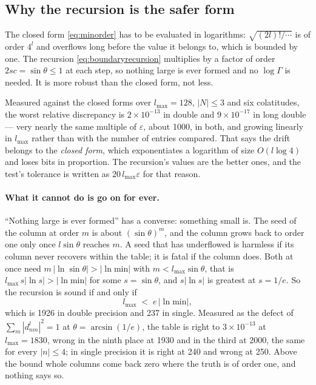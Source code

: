 \documentclass[11pt,a4paper]{article}
\begin{document}
\subsection{Why the recursion is the safer form}

The closed form \eqref{eq:minorder} has to be evaluated in logarithms:
$\sqrt{(2l)!/\cdots}$ is of order $4^l$ and overflows long before the value
it belongs to, which is bounded by one.  The recursion
\eqref{eq:boundaryrecursion} multiplies by a factor of order $2sc =
\sin\theta \leq 1$ at each step, so nothing large is ever formed and no
$\log\Gamma$ is needed.  It is more robust than the closed form, not less.

Measured against the closed forms over $l_{\max}=128$, $|N|\leq 3$ and six
colatitudes, the worst relative discrepancy is $2\times10^{-13}$ in double
and $9\times10^{-17}$ in long double --- very nearly the same multiple of
$\varepsilon$, about 1000, in both, and growing linearly in $l_{\max}$
rather than with the number of entries compared.  That says the drift
belongs to the \emph{closed form}, which exponentiates a logarithm of size
$O(l\log 4)$ and loses bits in proportion.  The recursion's values are the
better ones, and the test's tolerance is written as $20\,l_{\max}
\varepsilon$ for that reason.

\paragraph{What it cannot do is go on for ever.}  ``Nothing large is ever
formed'' has a converse: something small is.  The seed of the column at
order $m$ is about $(\sin\theta)^m$, and the column grows back to order one
only once $l\sin\theta$ reaches $m$.  A seed that has underflowed is
harmless if its column never recovers within the table; it is fatal if the
column does.  Both at once need $m\,|\ln\sin\theta| > |\ln\mathrm{min}|$ with
$m < l_{\max}\sin\theta$, that is $l_{\max}\,s|\ln s| > |\ln\mathrm{min}|$ for
some $s=\sin\theta$, and $s|\ln s|$ is greatest at $s=1/e$.  So the recursion
is sound if and only if
\begin{equation}
  l_{\max} \;<\; e\,|\ln \mathrm{min}|,
  \label{eq:safedegree}
\end{equation}
which is 1926 in double precision and 237 in single.  Measured as the defect
of $\sum_m |d^l_{nm}|^2 = 1$ at $\theta=\arcsin(1/e)$, the table is right to
$3\times10^{-13}$ at $l_{\max}=1830$, wrong in the ninth place at 1930 and in
the third at 2000, the same for every $|n|\le4$; in single precision it is
right at 240 and wrong at 250.  Above the bound whole columns come back zero
where the truth is of order one, and nothing says so.
\end{document}
